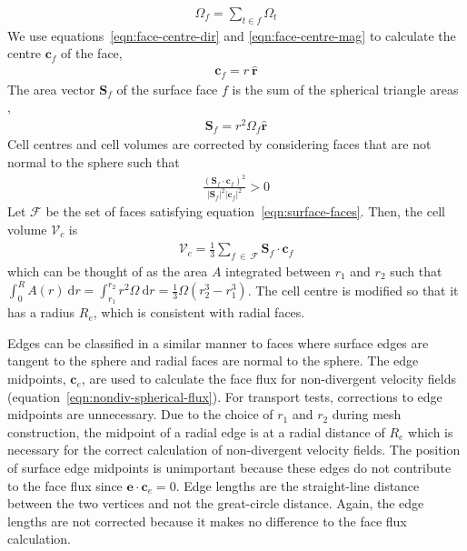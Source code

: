 \begin{align}
	\Omega_f = \sum_{t\in f}{\Omega_t}
\end{align}
We use equations~\eqref{eqn:face-centre-dir} and \eqref{eqn:face-centre-mag} to calculate the centre $\mathbf{c}_f$ of the face,
\begin{align}
	\mathbf{c}_f = r\:\mathbf{\hat{r}} \label{eqn:face-centre}
\end{align}
The area vector $\mathbf{S}_f$ of the surface face $f$ is the sum of the spherical triangle areas \citep{vanbrummelen2013},
\begin{align}
	\mathbf{S}_f = r^2 \Omega_f \mathbf{\hat{r}}
\end{align}
Cell centres and cell volumes are corrected by considering faces that are not normal to the sphere such that
\begin{align}
	\frac{\left(\mathbf{S}_f \cdot \mathbf{c}_f\right)^2}{\left\lvert \mathbf{S}_f \right\rvert^2 \left\lvert \mathbf{c}_f \right\rvert^2} > 0 \label{eqn:surface-faces}
\end{align}
Let $\mathcal{F}$ be the set of faces satisfying equation~\eqref{eqn:surface-faces}.  Then, the cell volume $\mathcal{V}_c$ is
\begin{align}
	\mathcal{V}_c = \frac{1}{3} \sum_{f\:\in\:\mathcal{F}} \mathbf{S}_f \cdot \mathbf{c}_f
\end{align}
which can be thought of as the area $A$ integrated between $r_1$ and $r_2$ such that 
$\int_0^R{A(r)\:\mathrm{d}r} = \int_{r_1}^{r_2}{r^2 \Omega\:\mathrm{d}r} = \frac{1}{3} \Omega \left( r_2^3 - r_1^3 \right)$.
The cell centre is modified so that it has a radius $R_e$, which is consistent with radial faces.

Edges can be classified in a similar manner to faces where surface edges are tangent to the sphere and radial faces are normal to the sphere.  The edge midpoints, $\mathbf{c}_e$, are used to calculate the face flux for non-divergent velocity fields (equation~\ref{eqn:nondiv-spherical-flux}).
For transport tests, corrections to edge midpoints are unnecessary.  Due to the choice of $r_1$ and $r_2$ during mesh construction, the midpoint of a radial edge is at a radial distance of $R_e$ which is necessary for the correct calculation of non-divergent velocity fields.
The position of surface edge midpoints is unimportant because these edges do not contribute to the face flux since $\mathbf{e} \cdot \mathbf{c}_e = 0$.
Edge lengths are the straight-line distance between the two vertices and not the great-circle distance.  Again, the edge lengths are not corrected because it makes no difference to the face flux calculation.
